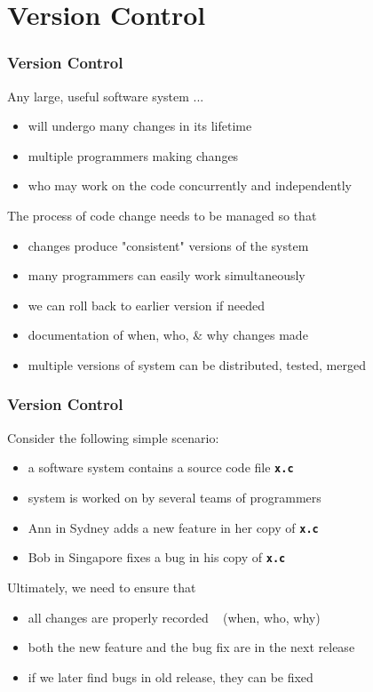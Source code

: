 

\section{Version Control}
\begin{frame}
\frametitle{Version Control}

Any large, useful software system ...

\begin{itemize}
\item  will undergo many changes in its lifetime
\item  multiple programmers making changes
\item  who may work on the code concurrently and independently
\end{itemize}

The process of code change needs to be managed so that

\begin{itemize}
\item  changes produce "consistent" versions of the system
\item  many programmers can easily work simultaneously
\item  we can roll back to earlier version if needed
\item  documentation of when, who, \& why changes made
\item  multiple versions of system can be distributed, tested, merged
\end{itemize}

\end{frame}

\begin{frame}
\frametitle{Version Control}
Consider the following simple scenario:
\begin{itemize}
\item  a software system contains a source code file \textbf{\tt{x.c}}
\item  system is worked on by several teams of programmers
\item  Ann in Sydney adds a new feature in her copy of \textbf{\tt{x.c}}
\item  Bob in Singapore fixes a bug in his copy of \textbf{\tt{x.c}}
\end{itemize}
Ultimately, we need to ensure that
\begin{itemize}
\item  all changes are properly recorded ~ {\small (when, who, why)}
\item  both the new feature and the bug fix are in the next release
\item  if we later find bugs in old release, they can be fixed
\end{itemize}
\end{frame}

